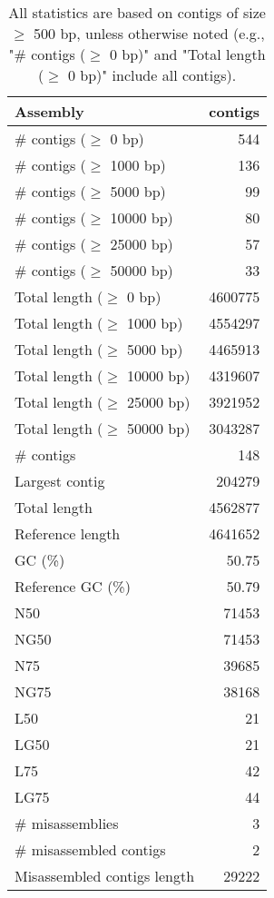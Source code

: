 \documentclass[12pt,a4paper]{article}
\begin{document}
\begin{table}[ht]
\begin{center}
\caption{All statistics are based on contigs of size $\geq$ 500 bp, unless otherwise noted (e.g., "\# contigs ($\geq$ 0 bp)" and "Total length ($\geq$ 0 bp)" include all contigs).}
\begin{tabular}{|l*{1}{|r}|}
\hline
Assembly & contigs \\ \hline
\# contigs ($\geq$ 0 bp) & 544 \\ \hline
\# contigs ($\geq$ 1000 bp) & 136 \\ \hline
\# contigs ($\geq$ 5000 bp) & 99 \\ \hline
\# contigs ($\geq$ 10000 bp) & 80 \\ \hline
\# contigs ($\geq$ 25000 bp) & 57 \\ \hline
\# contigs ($\geq$ 50000 bp) & 33 \\ \hline
Total length ($\geq$ 0 bp) & 4600775 \\ \hline
Total length ($\geq$ 1000 bp) & 4554297 \\ \hline
Total length ($\geq$ 5000 bp) & 4465913 \\ \hline
Total length ($\geq$ 10000 bp) & 4319607 \\ \hline
Total length ($\geq$ 25000 bp) & 3921952 \\ \hline
Total length ($\geq$ 50000 bp) & 3043287 \\ \hline
\# contigs & 148 \\ \hline
Largest contig & 204279 \\ \hline
Total length & 4562877 \\ \hline
Reference length & 4641652 \\ \hline
GC (\%) & 50.75 \\ \hline
Reference GC (\%) & 50.79 \\ \hline
N50 & 71453 \\ \hline
NG50 & 71453 \\ \hline
N75 & 39685 \\ \hline
NG75 & 38168 \\ \hline
L50 & 21 \\ \hline
LG50 & 21 \\ \hline
L75 & 42 \\ \hline
LG75 & 44 \\ \hline
\# misassemblies & 3 \\ \hline
\# misassembled contigs & 2 \\ \hline
Misassembled contigs length & 29222 \\ \hline

\end{tabular}
\end{center}
\end{table}
\end{document}
